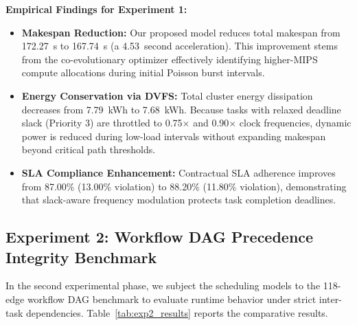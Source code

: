 \documentclass[default,sn-mathphys-num]{sn-jnl}
\theoremstyle{thmstyleone}
\theoremstyle{thmstyletwo}
\theoremstyle{thmstylethree}
\begin{document}
\noindent \textbf{Empirical Findings for Experiment 1:}
\begin{itemize}
    \item \textbf{Makespan Reduction:} Our proposed model reduces total makespan from 172.27~s to 167.74~s (a 4.53~second acceleration). This improvement stems from the co-evolutionary optimizer effectively identifying higher-MIPS compute allocations during initial Poisson burst intervals.
    \item \textbf{Energy Conservation via DVFS:} Total cluster energy dissipation decreases from 7.79~kWh to 7.68~kWh. Because tasks with relaxed deadline slack (Priority 3) are throttled to 0.75$\times$ and 0.90$\times$ clock frequencies, dynamic power is reduced during low-load intervals without expanding makespan beyond critical path thresholds.
    \item \textbf{SLA Compliance Enhancement:} Contractual SLA adherence improves from 87.00\% (13.00\% violation) to 88.20\% (11.80\% violation), demonstrating that slack-aware frequency modulation protects task completion deadlines.
\end{itemize}

\subsection{Experiment 2: Workflow DAG Precedence Integrity Benchmark}
In the second experimental phase, we subject the scheduling models to the 118-edge workflow DAG benchmark to evaluate runtime behavior under strict inter-task dependencies. Table~\ref{tab:exp2_results} reports the comparative results.
\end{document}
